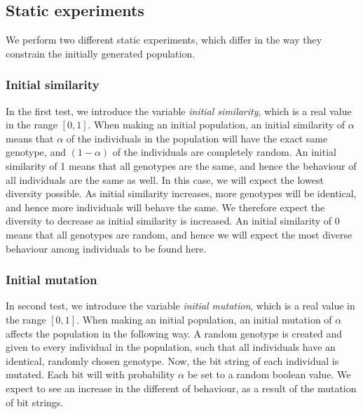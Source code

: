 \subsection{Static experiments}
We perform two different static experiments, which differ in the way they constrain the initially generated population. 

\subsubsection{Initial similarity}
In the first test, we introduce the variable \emph{initial similarity}, which is a real value in the range $[0,1]$.
When making an initial population, an initial similarity of $\alpha$ means that $\alpha$ of the individuals in the population will have the exact same genotype, and $(1-\alpha)$ of the individuals are completely random.
An initial similarity of \num{1} means that all genotypes are the same, and hence the behaviour of all individuals are the same as well. In this case, we will expect the lowest diversity possible.
As initial similarity increases, more genotypes will be identical, and hence more individuals will behave the same.
We therefore expect the diversity to decrease as initial similarity is increased.
An initial similarity of \num{0} means that all genotypes are random, and hence we will expect the most diverse behaviour among individuals to be found here.

\subsubsection{Initial mutation}
In second test, we introduce the variable \emph{initial mutation}, which is a real value in the range $[0,1]$.
When making an initial population, an initial mutation of $\alpha$ affects the population in the following way.
A random genotype is created and given to every individual in the population, such that all individuals have an identical, randomly chosen genotype.
Now, the bit string of each individual is mutated. Each bit will with probability $\alpha$ be set to a random boolean value. 
We expect to see an increase in the different of behaviour, as a result of the mutation of bit strings. 

